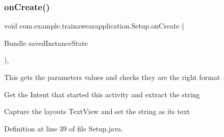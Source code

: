 \mbox{\label{classcom_1_1example_1_1trainawearapplication_1_1_setup_a52f522c34d14c93dbf7f75ff75ce606d}} 
\subsubsection{\texorpdfstring{onCreate()}{onCreate()}}
{\footnotesize\ttfamily void com.\+example.\+trainawearapplication.\+Setup.\+on\+Create (\begin{DoxyParamCaption}\item[{Bundle}]{saved\+Instance\+State }\end{DoxyParamCaption})\hspace{0.3cm}{\ttfamily [inline]}, {\ttfamily [protected]}}

This gets the parameters values and checks they are the right format

Get the Intent that started this activity and extract the string

Capture the layout\textquotesingle{}s Text\+View and set the string as its text

Definition at line 39 of file Setup.\+java.


